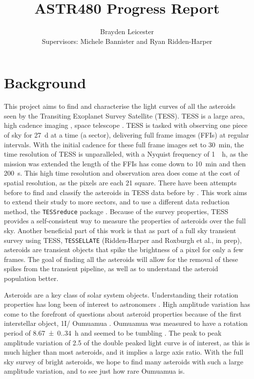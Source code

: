 \documentclass[12pt]{article}
\title{ASTR480 Progress Report}
\author{Brayden Leicester \\[1ex]
\small{Supervisors: Michele Bannister and Ryan Ridden-Harper}
}
\DeclareRobustCommand{\okina}{%
  \raisebox{\dimexpr\fontcharht\font`A-\height}{%
    \scalebox{0.8}{`}%
  }%
}
\newcommand{\omuamua}{\okina Oumuamua }
\begin{document}
\maketitle


\section{Background}

This project aims to find and characterise the light curves of all the asteroids seen by the Transiting Exoplanet Survey Satellite (TESS). 
TESS is a large area, high cadence imaging , space telescope  \citep{Ricker2014}. 
TESS is tasked with observing one piece of sky for \qty{27}{\day} at a time (a sector), delivering  full frame images (FFIs) at regular intervals. 
With the initial cadence for these full frame images set to \qty{30}{\minute}, the time resolution of TESS is unparalleled, with a Nyquist frequency of \qty{1}{\per\hour}, as the mission was extended the length of the FFIs has come down to \qty{10}{\minute} and then \qty{200}{\second}. 
This high time resolution and observation area does come at the cost of spatial resolution, as the pixels are each \qty{21}{\arcsec} square.
There have been attempts before to find and classify the asteroids in TESS data before by \citet{Pal2018, Pal2020}. This work aims to extend their study to more sectors, and to use a different data reduction method, the \texttt{TESSreduce} package \citep{Ridden-Harper2021}.
Because of the survey properties, TESS provides a self-consistent way to measure the properties of asteroids over the full sky.   
Another beneficial part of this work is that as part of a full sky transient survey using TESS, \texttt{TESSELLATE} (Ridden-Harper and Roxburgh et al., in prep), asteroids are transient objects that spike the brightness of a pixel for only a few frames.
The goal of finding all the asteroids will allow for the removal of these spikes from the transient pipeline, as well as to understand the asteroid population better.  


Asteroids are a key class of solar system objects. 
Understanding their rotation properties has long been of interest to astronomers \citep[e.g.][]{Weidenschilling1981,Harris1994}. %
High amplitude variation has come to the forefront of questions about asteroid properties because of the first interstellar object, 1I/\omuamua \citep[see][for a review]{Bannister2019}. 
\omuamua was measured to have a rotation period of \qty{8.67(0.34)}{\hour} \citep{Belton2018} and seemed to be tumbling \citep[e.g.][]{Drahus2018,Fraser2018}. 
The peak to peak amplitude variation of \qty{2.5}{\mag} \citep{Meech2017} of the double peaked light curve is of interest, as this is much higher than most asteroids, and it implies a large axis ratio. 
With the full sky survey of bright asteroids, we hope to find many asteroids with such a large amplitude variation, and to see just how rare \omuamua is.  
\end{document}
